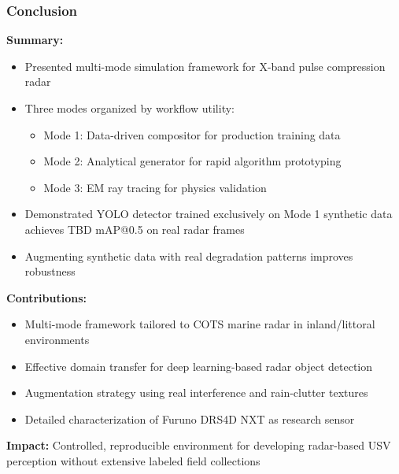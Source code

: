 \documentclass[aspectratio=169, 10pt]{beamer}
\begin{document}
\begin{frame}
  \frametitle{Conclusion}
  \vspace{-0.1cm}

  \footnotesize
  \textbf{Summary:}
  \setlength{\itemsep}{0pt}
  \begin{itemize}
    \item Presented multi-mode simulation framework for X-band pulse compression radar
    \item Three modes organized by workflow utility:
    \setlength{\itemsep}{0pt}
    \begin{itemize}
      \item Mode 1: Data-driven compositor for production training data
      \item Mode 2: Analytical generator for rapid algorithm prototyping
      \item Mode 3: EM ray tracing for physics validation
    \end{itemize}
    \item Demonstrated YOLO detector trained exclusively on Mode 1 synthetic data achieves TBD mAP@0.5 on real radar frames
    \item Augmenting synthetic data with real degradation patterns improves robustness
  \end{itemize}

  \vspace{0.2cm}
  \textbf{Contributions:}
  \setlength{\itemsep}{0pt}
  \begin{itemize}
    \item Multi-mode framework tailored to COTS marine radar in inland/littoral environments
    \item Effective domain transfer for deep learning-based radar object detection
    \item Augmentation strategy using real interference and rain-clutter textures
    \item Detailed characterization of Furuno DRS4D NXT as research sensor
  \end{itemize}

  \vspace{0.15cm}
  \footnotesize
  \textbf{Impact:} Controlled, reproducible environment for developing radar-based USV perception without extensive labeled field collections
\end{frame}
\end{document}
